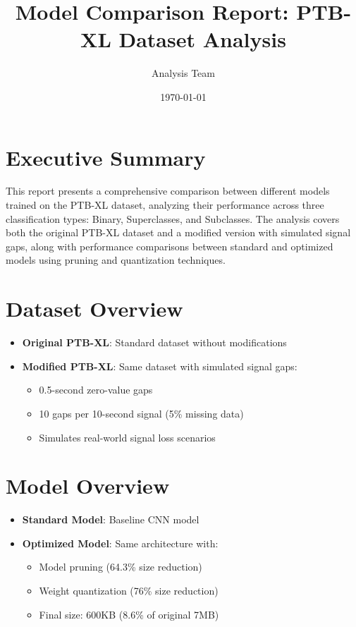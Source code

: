 \documentclass[12pt,a4paper]{article}
\title{Model Comparison Report: PTB-XL Dataset Analysis}
\author{Analysis Team}
\date{\today}
\begin{document}
\maketitle

\section{Executive Summary}
This report presents a comprehensive comparison between different models trained on the PTB-XL dataset, analyzing their performance across three classification types: Binary, Superclasses, and Subclasses. The analysis covers both the original PTB-XL dataset and a modified version with simulated signal gaps, along with performance comparisons between standard and optimized models using pruning and quantization techniques.

\section{Dataset Overview}
\begin{itemize}
    \item \textbf{Original PTB-XL}: Standard dataset without modifications
    \item \textbf{Modified PTB-XL}: Same dataset with simulated signal gaps:
    \begin{itemize}
        \item 0.5-second zero-value gaps
        \item 10 gaps per 10-second signal (5\% missing data)
        \item Simulates real-world signal loss scenarios
    \end{itemize}
\end{itemize}

\section{Model Overview}
\begin{itemize}
    \item \textbf{Standard Model}: Baseline CNN model
    \item \textbf{Optimized Model}: Same architecture with:
    \begin{itemize}
        \item Model pruning (64.3\% size reduction)
        \item Weight quantization (76\% size reduction)
        \item Final size: 600KB (8.6\% of original 7MB)
    \end{itemize}
\end{itemize}
\end{document}
